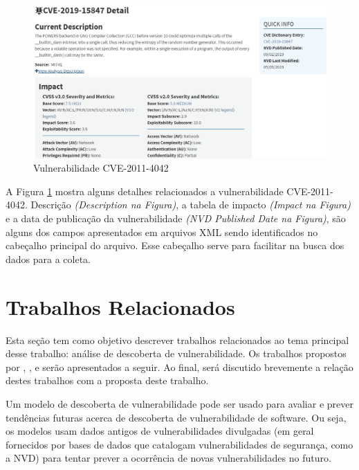 \begin{figure}[H]
\centering
\includegraphics[width=1\textwidth]{imagens/nvd_exemplo3.png}
\caption{Vulnerabilidade CVE-2011-4042}
\label{fig:nvd3}
\end{figure}

A Figura \ref{fig:nvd3} mostra alguns detalhes relacionados a vulnerabilidade CVE-2011-4042.  Descrição \textit{(Description na Figura)}, a tabela de impacto \textit{(Impact na Figura)} e a data de publicação da vulnerabilidade \textit{(NVD Published Date na Figura)}, são alguns dos campos apresentados em arquivos XML sendo identificados no cabeçalho principal do arquivo. Esse cabeçalho serve para facilitar na busca dos dados para a coleta.

\section{Trabalhos Relacionados}

Esta seção tem como objetivo descrever trabalhos relacionados ao tema principal desse trabalho: análise de descoberta de vulnerabilidade. Os trabalhos propostos por , ,  e  serão apresentados a seguir. Ao final, será discutido brevemente a relação destes trabalhos com a proposta deste trabalho.

Um modelo de descoberta de vulnerabilidade pode ser usado para avaliar e prever tendências futuras acerca de descoberta de vulnerabilidade de software. Ou seja, os modelos usam dados antigos de vulnerabilidades divulgadas (em geral fornecidos por bases de dados que catalogam vulnerabilidades de segurança, como a NVD) para tentar prever a ocorrência de novas vulnerabilidades no futuro.

